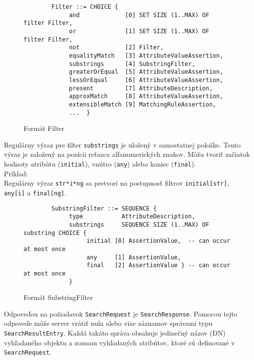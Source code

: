\documentclass[11pt,a4paper]{article}
\begin{document}
\begin{figure}[H]
\begin{verbatim}
        Filter ::= CHOICE {
             and             [0] SET SIZE (1..MAX) OF filter Filter,
             or              [1] SET SIZE (1..MAX) OF filter Filter,
             not             [2] Filter,
             equalityMatch   [3] AttributeValueAssertion,
             substrings      [4] SubstringFilter,
             greaterOrEqual  [5] AttributeValueAssertion,
             lessOrEqual     [6] AttributeValueAssertion,
             present         [7] AttributeDescription,
             approxMatch     [8] AttributeValueAssertion,
             extensibleMatch [9] MatchingRuleAssertion,
             ...  }
\end{verbatim}
\caption{Formát Filter}
\end{figure}

\noindent Regulárny výraz pre filter \texttt{substrings} je uložený v samostatnej položke. Tento výraz je založený na pozícii reťazca alfanumerických znakov. Môžu tvoriť začiatok hodnoty atribútu (\texttt{initial}), vnútro (\texttt{any}) alebo koniec (\texttt{final}).\\

\noindent Príklad:\\

\noindent Regulárny výraz \texttt{str*i*ng} sa pretvorí na postupnosť filtrov \texttt{initial[str]}, \texttt{any[i]} a \texttt{final[ng]}.\\

\begin{figure}[H]
\begin{verbatim}
        SubstringFilter ::= SEQUENCE {
             type           AttributeDescription,
             substrings     SEQUENCE SIZE (1..MAX) OF substring CHOICE {
                  initial [0] AssertionValue,  -- can occur at most once
                  any     [1] AssertionValue,
                  final   [2] AssertionValue } -- can occur at most once
             }
\end{verbatim}
\caption{Formát SubstringFilter}
\end{figure}

\noindent Odpoveďou na požiadavok \texttt{SearchRequest} je \texttt{SearchResponse}. Pomocou tejto odpovede môže server vrátiť nula alebo viac záznamov správami typu \texttt{SearchResultEntry}. Každá takáto správa obsahuje jedinečný názov (DN) vyhľadaného objektu a zoznam vyhľadaných atribútov, ktoré sú definované v \texttt{SearchRequest}.\\
\end{document}
